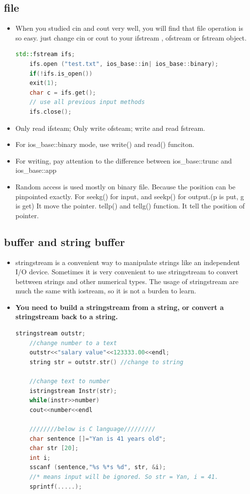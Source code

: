 \documentclass[a4paper,11pt,twoside]{book}
\begin{document}
\subsection{file}
\begin{itemize}
	\item When you studied cin and cout very well, you will find that file operation is so easy. just change cin or cout to your ifstream , ofstream or fstream object.
	
	\begin{lstlisting}[frame=single, language=c++]
	std::fstream ifs;
	ifs.open ("test.txt", ios_base::in| ios_base::binary);
	if(!ifs.is_open())
	exit(1);
	char c = ifs.get();
	// use all previous input methods
	ifs.close();
	\end{lstlisting}
	\item Only read ifsteam;  Only write ofsteam; write and read fstream.
	
	\item For ios\_base::binary mode, use write() and read() funciton.
	
	\item For writing, pay attention to the difference between ios\_base::trunc and ios\_base::app
	
	\item Random access is used mostly on binary file. Because the position can be pinpointed exactly. For seekg() for input, and seekp() for output.(p is put, g is get) It move the pointer. tellp() and tellg() function.  It tell the position of pointer.
	
\end{itemize}

\subsection{buffer and string buffer}

\begin{itemize}
	\item stringstream is a convenient way to manipulate strings like an independent I/O device. Sometimes it is very convenient to use stringstream to convert bettween strings and other numerical types. The usage of stringstream are much the same with iostream, so it is not a burden to learn.  
	
	\item \textbf{You need to build a stringstream from a string, or convert a stringstream back to a string.}
	
	\begin{lstlisting}[frame=single, language=c++]
	stringstream outstr;
	//change number to a text
	outstr<<"salary value"<<123333.00<<endl;
	string str = outstr.str() //change to string
	
	//change text to number
	istringstream Instr(str);
	while(instr>>number)
	cout<<number<<endl
	
	////////below is C language/////////
	char sentence []="Yan is 41 years old";
	char str [20];
	int i;
	sscanf (sentence,"%s %*s %d", str, &i);
	//* means input will be ignored. So str = Yan, i = 41.
	sprintf(.....);
	\end{lstlisting}
	
\end{itemize}
\end{document}
